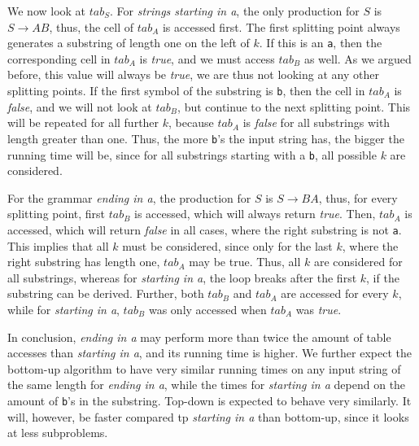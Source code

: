 We now look at $tab_S$.
For \textit{strings starting in a}, the only production for $S$ is $S\rightarrow AB$, thus, the cell of $tab_A$ is accessed first.
The first splitting point always generates a substring of length one on the left of $k$.
If this is an \texttt{a}, then the corresponding cell in $tab_A$ is \textit{true}, and we must access $tab_B$ as well.
As we argued before, this value will always be \textit{true}, we are thus not looking at any other splitting points.
If the first symbol of the substring is \texttt{b}, then the cell in $tab_A$ is \textit{false}, and we will not look at $tab_B$, but continue to the next splitting point.
This will be repeated for all further $k$, because $tab_A$ is \textit{false} for all substrings with length greater than one.
Thus, the more \texttt{b}'s the input string has, the bigger the running time will be, since for all substrings starting with a \texttt{b}, all possible $k$ are considered.

For the grammar \textit{ending in a}, the production for $S$ is $S\rightarrow BA$, thus, for every splitting point, first $tab_B$ is accessed, which will always return \textit{true}.
Then, $tab_A$ is accessed, which will return \textit{false} in all cases, where the right substring is not \texttt{a}.
This implies that all $k$ must be considered, since only for the last $k$, where the right substring has length one, $tab_A$ may be true.
Thus, all $k$ are considered for all substrings, whereas for \textit{starting in a}, the loop breaks after the first $k$, if the substring can be derived.
Further, both $tab_B$ and $tab_A$ are accessed for every $k$, while for \textit{starting in a}, $tab_B$ was only accessed when $tab_A$ was \textit{true}.

In conclusion, \textit{ending in a} may perform more than twice the amount of table accesses than \textit{starting in a}, and its running time is higher.
We further expect the bottom-up algorithm to have very similar running times on any input string of the same length for \textit{ending in a}, while the times for \textit{starting in a} depend on the amount of \texttt{b}'s in the substring.
Top-down is expected to behave very similarly.
It will, however, be faster compared tp \textit{starting in a} than bottom-up, since it looks at less subproblems.

